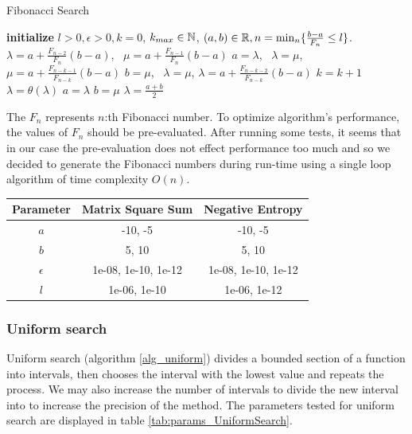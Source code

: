 \documentclass[english, 12pt, a4paper, sci, utf8, a-1b, online, table]{aaltothesis}
\newcommand{\R}{\ensuremath\mathbb{R}}
\newcommand{\N}{\ensuremath\mathbb{N}}
\begin{document}
\begin{algorithm}[H]
\caption{Fibonacci Search}
\label{alg_fibonacci}
\begin{algorithmic}[1]
\STATE \textbf{initialize} $l > 0, \epsilon > 0, k = 0$, $k_{max} \in \N$, $(a, b) \in \R, n = \mathrm{min}_n \{ \frac{b - a}{F_n} \leq l \}$.
\STATE $\lambda = a + \frac{F_{n-2}}{F_n} (b - a)$, \  $\mu = a + \frac{F_{n-1}}{F_n} (b - a)$
    \IF{$\theta(\lambda) < \theta(\mu)$}
        \STATE $a = \lambda$, \ $\lambda = \mu$, $\mu = a + \frac{F_{n-k-1}}{F_{n-k}} (b - a)$
    \ELSE
        \STATE $b = \mu$, \ $\lambda = \mu$, $\lambda = a + \frac{F_{n-k-2}}{F_{n-k}} (b - a)$
    \ENDIF
    \STATE $k = k + 1$
\ENDWHILE
\STATE $\lambda = \theta(\lambda)$
\IF{$\theta(\lambda) > \theta(\mu + \epsilon)$}
    \STATE $a = \lambda$
\ELSE
    \STATE $b = \mu$
\ENDIF
\RETURN $\lambda = \frac{a + b}{2}$
\end{algorithmic}
\end{algorithm}

The $F_n$ represents $n$:th Fibonacci number. To optimize algorithm's performance, the values of $F_n$ should be pre-evaluated. After running some tests, it seems that in our case the pre-evaluation does not effect performance too much and so we decided to generate the Fibonacci numbers during run-time using a single loop algorithm of time complexity $O(n)$.

\begin{table}[H]
\label{tab:params_FibonacciSearch}
\centering
{}
\begin{tabular}{|c|c|c|}
\hline
\rowcolor{gray!25}
Parameter & Matrix Square Sum & Negative Entropy \\
\hline
$a$ & -10, -5 & -10, -5 \\
$b$ & 5, 10 & 5, 10 \\
$\epsilon$ & 1e-08, 1e-10, 1e-12 & 1e-08, 1e-10, 1e-12 \\
$l$ & 1e-06, 1e-10 & 1e-06, 1e-12 \\
\hline
\end{tabular}
\end{table}


\subsubsection{Uniform search}


Uniform search (algorithm \ref{alg_uniform}) divides a bounded section of a function into intervals, then chooses the interval with the lowest value and repeats the process. We may also increase the number of intervals to divide the new interval into to increase the precision of the method. The parameters tested for uniform search are displayed in table \ref{tab:params_UniformSearch}. \cite{book:nonlinear_programming}
\end{document}
